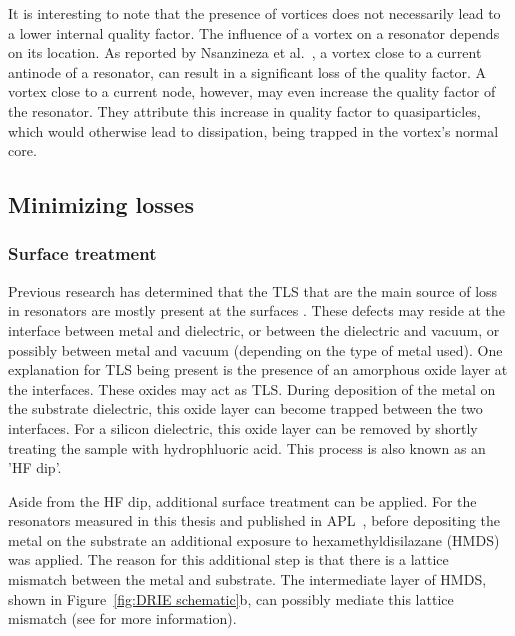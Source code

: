       It is interesting to note that the presence of vortices does not necessarily lead to a lower internal quality factor. The influence of a vortex on a resonator depends on its location. As reported by Nsanzineza et al.~\cite{nsanzineza2014trapping}, a vortex close to a current antinode of a resonator, can result in a significant loss of the quality factor. A vortex close to a current node, however, may even increase the quality factor of the resonator. They attribute this increase in quality factor to quasiparticles, which would otherwise lead to dissipation, being trapped in the vortex's normal core.





  \subsection{Minimizing losses}

  \subsubsection{Surface treatment}

  Previous research has determined that the TLS that are the main source of loss in resonators are mostly present at the surfaces \cite{gao2008experimental}. These defects may reside at the interface between metal and dielectric, or between the dielectric and vacuum, or possibly between metal and vacuum (depending on the type of metal used). One explanation for TLS being present is the presence of an amorphous oxide layer at the interfaces. These oxides may act as TLS. During deposition of the metal on the substrate dielectric, this oxide layer can become trapped between the two interfaces. For a silicon dielectric, this oxide layer can be removed by shortly treating the sample with hydrophluoric acid. This process is also known as an 'HF dip'.

  Aside from the HF dip, additional surface treatment can be applied. For the resonators measured in this thesis and published in APL~\cite{bruno2015reducing}, before depositing the metal on the substrate an additional exposure to hexamethyldisilazane (HMDS) was applied. The reason for this additional step is that there is a lattice mismatch between the metal and substrate. The intermediate layer of HMDS, shown in Figure~\ref{fig:DRIE schematic}b, can possibly mediate this lattice mismatch (see \cite{bruno2015reducing} for more information).


